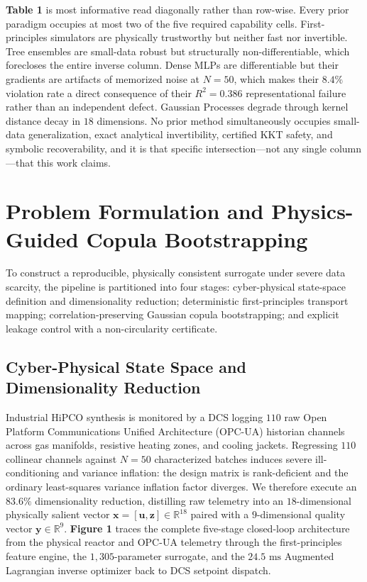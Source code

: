 \documentclass[10pt,journal,onecolumn]{IEEEtran}
\begin{document}
\textbf{Table 1} is most informative read diagonally rather than row-wise. Every prior paradigm occupies at most two of the five required capability cells. First-principles simulators are physically trustworthy but neither fast nor invertible. Tree ensembles are small-data robust but structurally non-differentiable, which forecloses the entire inverse column. Dense MLPs are differentiable but their gradients are artifacts of memorized noise at $N = 50$, which makes their $8.4\%$ violation rate a direct consequence of their $R^2 = 0.386$ representational failure rather than an independent defect. Gaussian Processes degrade through kernel distance decay in $18$ dimensions. No prior method simultaneously occupies small-data generalization, exact analytical invertibility, certified KKT safety, and symbolic recoverability, and it is that specific intersection—not any single column—that this work claims.

\section{Problem Formulation and Physics-Guided Copula Bootstrapping}
To construct a reproducible, physically consistent surrogate under severe data scarcity, the pipeline is partitioned into four stages: cyber-physical state-space definition and dimensionality reduction; deterministic first-principles transport mapping; correlation-preserving Gaussian copula bootstrapping; and explicit leakage control with a non-circularity certificate.

\subsection{Cyber-Physical State Space and Dimensionality Reduction}
Industrial HiPCO synthesis is monitored by a DCS logging $110$ raw Open Platform Communications Unified Architecture (OPC-UA) historian channels across gas manifolds, resistive heating zones, and cooling jackets. Regressing $110$ collinear channels against $N = 50$ characterized batches induces severe ill-conditioning and variance inflation: the design matrix is rank-deficient and the ordinary least-squares variance inflation factor diverges. We therefore execute an $83.6\%$ dimensionality reduction, distilling raw telemetry into an $18$-dimensional physically salient vector $\mathbf{x} = [\mathbf{u}, \mathbf{z}] \in \mathbb{R}^{18}$ paired with a $9$-dimensional quality vector $\mathbf{y} \in \mathbb{R}^9$. \textbf{Figure 1} traces the complete five-stage closed-loop architecture from the physical reactor and OPC-UA telemetry through the first-principles feature engine, the $1,305$-parameter surrogate, and the $24.5\text{ ms}$ Augmented Lagrangian inverse optimizer back to DCS setpoint dispatch.
\end{document}
